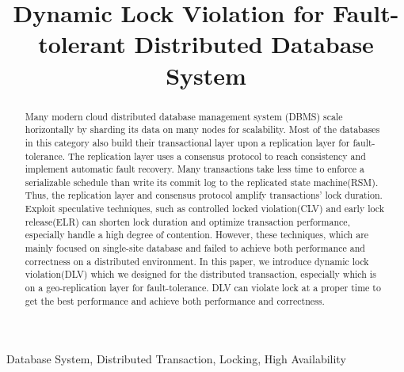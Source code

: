 \documentclass[conference]{IEEEtran}
\begin{document}
\title{Dynamic Lock Violation for Fault-tolerant Distributed Database System}


\author{
\and
{}
}

\maketitle

\begin{abstract}
Many modern cloud distributed database management system (DBMS) scale horizontally by sharding its data on many nodes for scalability.
Most of the databases in this category also build their transactional layer upon a replication layer for fault-tolerance.
The replication layer uses a consensus protocol to reach consistency and implement automatic fault recovery.
Many transactions take less time to enforce a serializable schedule than write its commit log to the replicated state machine(RSM). 
Thus,  the replication layer and consensus protocol amplify transactions' lock duration.
Exploit speculative techniques, such as controlled locked violation(CLV) and early lock release(ELR) can shorten lock duration and optimize transaction performance, especially handle a high degree of contention.
However, these techniques, which are mainly focused on single-site database and failed to achieve both performance and correctness on a distributed environment.
In this paper, we introduce dynamic lock violation(DLV) which we designed for the distributed transaction, especially which is on a geo-replication layer for fault-tolerance.
DLV can violate lock at a proper time to get the best performance and achieve both performance and correctness.

\end{abstract}

\begin{IEEEkeywords}
Database System, Distributed Transaction, Locking, High Availability
\end{IEEEkeywords}
\end{document}
